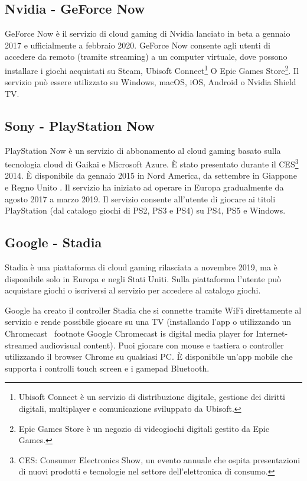 \subsection{Nvidia - GeForce Now}
GeForce Now è il servizio di cloud gaming di Nvidia lanciato in beta a gennaio 2017 e ufficialmente a febbraio 2020. GeForce Now consente agli utenti di accedere da remoto (tramite streaming) a un computer virtuale, dove possono installare i giochi acquistati su Steam, Ubisoft Connect\footnote{Ubisoft Connect è un servizio di distribuzione digitale, gestione dei diritti digitali, multiplayer e comunicazione sviluppato da Ubisoft.} O Epic Games Store\footnote{Epic Games Store è un negozio di videogiochi digitali gestito da Epic Games.}. Il servizio può essere utilizzato su Windows, macOS, iOS, Android o Nvidia Shield TV\cite{GeForce_Now}.

\subsection{Sony - PlayStation Now}
PlayStation Now è un servizio di abbonamento al cloud gaming basato sulla tecnologia cloud di Gaikai e Microsoft Azure. È stato presentato durante il CES\footnote{CES: Consumer Electronics Show, un evento annuale che ospita presentazioni di nuovi prodotti e tecnologie nel settore dell'elettronica di consumo.} 2014. È disponibile da gennaio 2015 in Nord America, da settembre in Giappone e Regno Unito . Il servizio ha iniziato ad operare in Europa gradualmente da agosto 2017 a marzo 2019. Il servizio consente all'utente di giocare ai titoli PlayStation (dal catalogo giochi di PS2, PS3 e PS4) su PS4, PS5 e Windows\cite{PlayStation_Now}.

\subsection{Google - Stadia}
Stadia è una piattaforma di cloud gaming rilasciata a novembre 2019, ma è disponibile solo in Europa e negli Stati Uniti. Sulla piattaforma l'utente può acquistare giochi o iscriversi al servizio per accedere al catalogo giochi.

Google ha creato il controller Stadia che si connette tramite WiFi direttamente al servizio e rende possibile giocare su una TV (installando l'app o utilizzando un Chromecast \ footnote {Google Chromecast is digital media player for Internet-streamed audiovisual content}). Puoi giocare con mouse e tastiera o controller utilizzando il browser Chrome su qualsiasi PC. È disponibile un'app mobile che supporta i controlli touch screen e i gamepad Bluetooth.

